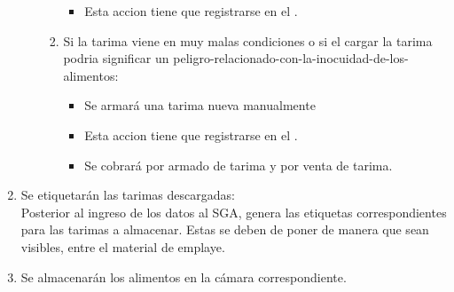 \begin{enumerate}
\begin{enumerate}
\begin{enumerate}
\begin{itemize}
                    \item Esta accion tiene que registrarse en el \Oent.
                \end{itemize}
            \item Si la tarima viene en muy malas condiciones o si el cargar la tarima podria significar un \gls{peligro-relacionado-con-la-inocuidad-de-los-alimentos}:
                \begin{itemize}
                    \item Se armará una tarima nueva manualmente
                    \item Esta accion tiene que registrarse en el \Oent.
                    \item Se cobrará por armado de tarima y por venta de tarima.
                \end{itemize}
        \end{enumerate}
    \end{enumerate}
    \item Se etiquetarán las tarimas descargadas:\\
    Posterior al ingreso de los datos al \gls{SGA}, {\itshape\MC} genera las etiquetas correspondientes para las tarimas a almacenar. Estas se deben de poner de manera que sean visibles, entre el material de emplaye.
    \item Se almacenarán los alimentos en la cámara correspondiente.
\end{enumerate}

